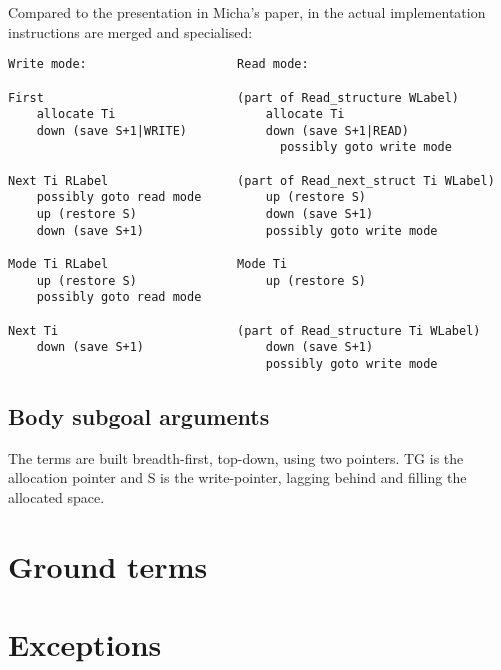   Compared to the presentation in Micha's paper, in the actual
   implementation instructions are merged and specialised:
\begin{verbatim}
Write mode:                     Read mode:

First                           (part of Read_structure WLabel)
    allocate Ti                     allocate Ti
    down (save S+1|WRITE)           down (save S+1|READ)
                                      possibly goto write mode

Next Ti RLabel                  (part of Read_next_struct Ti WLabel)
    possibly goto read mode         up (restore S)
    up (restore S)                  down (save S+1)
    down (save S+1)                 possibly goto write mode
                      
Mode Ti RLabel                  Mode Ti
    up (restore S)                  up (restore S)
    possibly goto read mode

Next Ti                         (part of Read_structure Ti WLabel)
    down (save S+1)                 down (save S+1)
                                    possibly goto write mode
\end{verbatim}


\subsection{Body subgoal arguments}

    The terms are built breadth-first, top-down, using two pointers.
    TG is the allocation pointer and S is the write-pointer, lagging
    behind and filling the allocated space.



\section{Ground terms}

\section{Exceptions}

